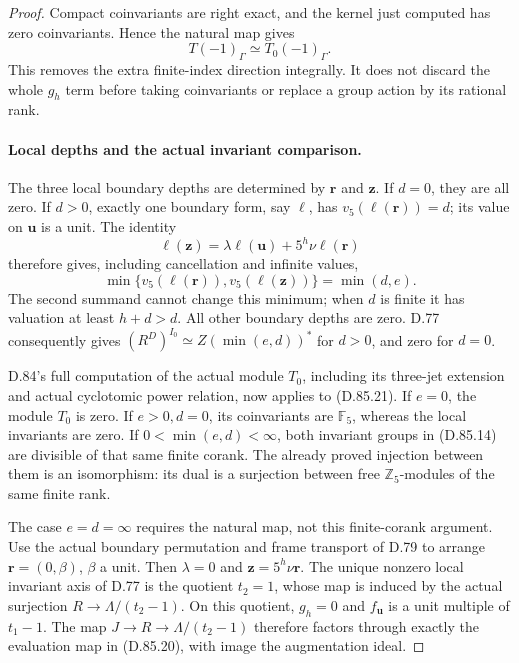 \begin{proof}
Compact coinvariants are right exact, and the kernel just
computed has zero coinvariants. Hence the natural map gives
\[
                    T(-1)_\Gamma\simeq T_0(-1)_\Gamma.
                                                               \tag{D.85.21}
\]
This removes the extra finite-index direction integrally.
It does not discard the whole \(g_h\) term before taking
coinvariants or replace a group action by its rational rank.

\paragraph{Local depths and the actual invariant comparison.}
The three local boundary depths are determined by
\(\mathbf r\) and \(\mathbf z\). If \(d=0\), they are
all zero. If \(d>0\), exactly one boundary form, say
\(\ell\), has \(v_5(\ell(\mathbf r))=d\); its value on
\(\mathbf u\) is a unit. The identity
\[
 \ell(\mathbf z)=\lambda\ell(\mathbf u)
                       +5^h\nu\ell(\mathbf r)
\]
therefore gives, including cancellation and infinite values,
\[
 \min\{v_5(\ell(\mathbf r)),v_5(\ell(\mathbf z))\}
                         =\min(d,e).
                                                               \tag{D.85.22}
\]
The second summand cannot change this minimum; when \(d\)
is finite it has valuation at least \(h+d>d\).
All other boundary depths are zero. D.77 consequently gives
\((R^D)^{I_0}\simeq Z(\min(e,d))^*\) for \(d>0\),
and zero for \(d=0\).

D.84's full computation of the actual module \(T_0\),
including its three-jet extension and actual cyclotomic
power relation, now applies to (D.85.21). If \(e=0\),
the module \(T_0\) is zero. If \(e>0,d=0\), its
coinvariants are \(\mathbb F_5\), whereas the local
invariants are zero. If \(0<\min(e,d)<\infty\), both
invariant groups in (D.85.14) are divisible of that same
finite corank. The already proved injection between them
is an isomorphism: its dual is a surjection between free
\(\mathbb Z_5\)-modules of the same finite rank.

The case \(e=d=\infty\) requires the natural map, not
this finite-corank argument. Use the actual boundary
permutation and frame transport of D.79 to arrange
\(\mathbf r=(0,\beta)\), \(\beta\) a unit. Then
\(\lambda=0\) and \(\mathbf z=5^h\nu\mathbf r\).
The unique nonzero local invariant axis of D.77 is the
quotient \(t_2=1\), whose map is induced by the actual
surjection \(R\to\Lambda/(t_2-1)\). On this quotient,
\(g_h=0\) and \(f_{\mathbf u}\) is a unit multiple of
\(t_1-1\). The map \(J\to R\to\Lambda/(t_2-1)\)
therefore factors through exactly the evaluation map
in (D.85.20), with image the augmentation ideal.


\end{proof}
